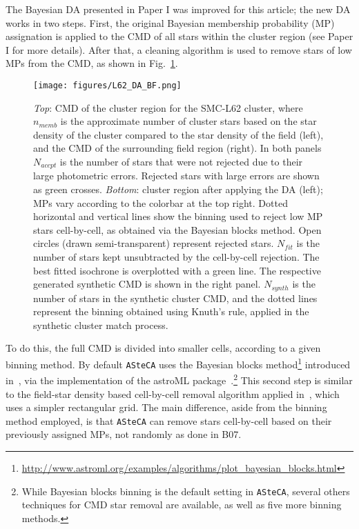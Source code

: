\documentclass{aa}
\begin{document}
The Bayesian DA presented in Paper I was improved for this article; the new DA
works in two steps. First, the original Bayesian membership probability (MP)
assignation is applied to the CMD of all stars within the cluster region (see
Paper I for more details).\@
%
After that, a cleaning algorithm is used to remove stars of low MPs from the
CMD, as shown in Fig.~\ref{fig:DA_BF}.
%
\begin{figure}
\centering
\texttt{[image: figures/L62\_DA\_BF.png]}
\caption{\emph{Top}: CMD of the cluster region for the SMC-L62 cluster, where
$n_{memb}$ is the approximate number of cluster stars based on the star density
of the cluster compared to the star density of the field (left), and the CMD of
the surrounding field region (right).
In both panels $N_{accpt}$ is the number of stars that were not rejected due to
their large photometric errors. Rejected stars with large errors are shown as
green crosses.
%
\emph{Bottom}: cluster region after applying the DA (left); MPs vary
according to the colorbar at the top right. Dotted horizontal and vertical lines
show the binning used to reject low MP stars cell-by-cell, as obtained via the
Bayesian blocks method. Open circles (drawn semi-transparent) represent rejected
stars.
$N_{fit}$ is the number of stars kept unsubtracted by the cell-by-cell
rejection. The best fitted isochrone is overplotted with a green line. 
The respective generated synthetic CMD is shown in the right panel. $N_{synth}$
is the number of stars in the synthetic cluster CMD, and the dotted lines
represent the binning obtained using Knuth's rule, applied in the synthetic
cluster match process.}
\label{fig:DA_BF}
\end{figure}
%
To do this, the full CMD is divided into smaller cells, according to a
given binning method. By default \texttt{ASteCA} uses the Bayesian blocks
method\footnote{\url{http://www.astroml.org/examples/algorithms/plot_bayesian_blocks.html}}
introduced in~\cite{Scargle_2013}, via the implementation of the astroML
package~\citep{Vanderplas_2012}.\footnote{While Bayesian blocks binning is the
default setting in \texttt{ASteCA}, several others techniques for CMD star
removal are available, as well as five more binning methods.}
This second step is similar to the field-star density based cell-by-cell removal
algorithm applied in~\citet[][B07]{Bonatto_2007}, which uses a simpler
rectangular grid.
%
The main difference, aside from the binning method employed, is that
\texttt{ASteCA} can remove stars cell-by-cell based on their previously assigned
MPs, not randomly as done in B07.
\end{document}
